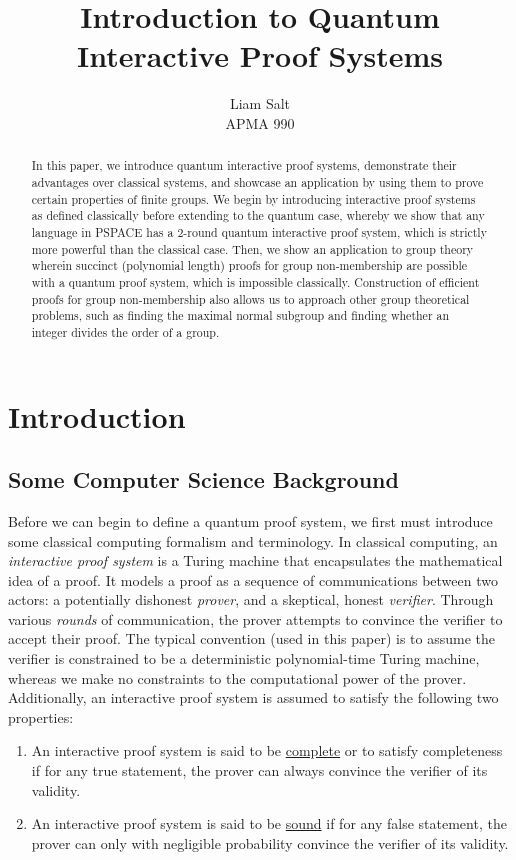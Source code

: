 \documentclass[12pt]{article}
\title{Introduction to Quantum Interactive Proof Systems}
\author{Liam Salt\\APMA 990}
\numberwithin{thm}{section}
\numberwithin{defn}{section}
\numberwithin{prop}{section}
\numberwithin{rmk}{section}
\begin{document}
	\maketitle
	
	\begin{abstract}
		In this paper, we introduce quantum interactive proof systems, demonstrate their advantages over classical systems, and showcase an application by using them to prove certain properties of finite groups. We begin by introducing interactive proof systems as defined classically before extending to the quantum case, whereby we show that any language in PSPACE has a $2$-round quantum interactive proof system, which is strictly more powerful than the classical case. Then, we show an application to group theory wherein succinct (polynomial length) proofs for group non-membership are possible with a quantum proof system, which is impossible classically. Construction of efficient proofs for group non-membership also allows us to approach other group theoretical problems, such as finding the maximal normal subgroup and finding whether an integer divides the order of a group.
	\end{abstract}
	\section{Introduction}
	
	\subsection{Some Computer Science Background}
	
	Before we can begin to define a quantum proof system, we first must introduce some classical computing formalism and terminology. In classical computing, an \textit{interactive proof system} is a Turing machine that encapsulates the mathematical idea of a proof. It models a proof as a sequence of communications between two actors: a potentially dishonest \textit{prover}, and a skeptical, honest \textit{verifier}. Through various \textit{rounds} of communication, the prover attempts to convince the verifier to accept their proof. The typical convention (used in this paper) is to assume the verifier is constrained to be a deterministic polynomial-time Turing machine, whereas we make no constraints to the computational power of the prover. Additionally, an interactive proof system is assumed to satisfy the following two properties:
	\begin{enumerate}[label=(\roman*)]
		\item An interactive proof system is said to be \underline{complete} or to satisfy completeness if for any true statement, the prover can always convince the verifier of its validity.
		\item An interactive proof system is said to be \underline{sound} if for any false statement, the prover can only with negligible probability convince the verifier of its validity.
	\end{enumerate}
\end{document}
